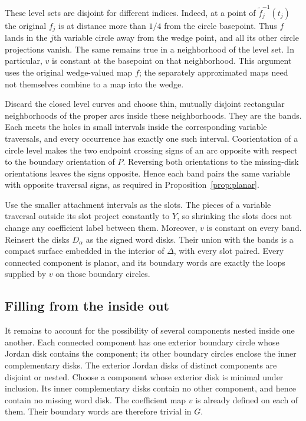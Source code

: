 These level sets are disjoint for different indices. Indeed, at a point
of $\widetilde f_j^{-1}(t_j)$ the original $f_j$ is at distance more
than $1/4$ from the circle basepoint. Thus $f$ lands in the $j$th
variable circle away from the wedge point, and all its other circle
projections vanish. The same remains true in a neighborhood of the
level set. In particular, $v$ is constant at the basepoint on that
neighborhood. This argument uses the original wedge-valued map $f$;
the separately approximated maps need not themselves combine to a map
into the wedge.

Discard the closed level curves and choose thin, mutually disjoint
rectangular neighborhoods of the proper arcs inside these neighborhoods.
They are the bands. Each meets the holes in small intervals inside the
corresponding variable traversals, and every occurrence has exactly one
such interval. Coorientation of a circle level makes the two endpoint
crossing signs of an arc opposite with respect to the boundary
orientation of $P$. Reversing both orientations to the missing-disk
orientations leaves the signs opposite. Hence each band pairs the same
variable with opposite traversal signs, as required in
Proposition~\ref{prop:planar}.

Use the smaller attachment intervals as the slots. The pieces of a
variable traversal outside its slot project constantly to $Y$, so
shrinking the slots does not change any coefficient label between them.
Moreover, $v$ is constant on every band. Reinsert the disks $D_\alpha$
as the signed word disks. Their union with the bands is a compact
surface embedded in the interior of $\Delta$, with every slot paired.
Every connected component is planar, and its boundary words are exactly
the loops supplied by $v$ on those boundary circles.

\subsection{Filling from the inside out}

It remains to account for the possibility of several components nested
inside one another. Each connected component has one exterior boundary
circle whose Jordan disk contains the component; its other boundary
circles enclose the inner complementary disks. The exterior Jordan
disks of distinct components are disjoint or nested. Choose a component
whose exterior disk is minimal under inclusion. Its inner complementary
disks contain no other component, and hence contain no missing word disk.
The coefficient map $v$ is already defined on each of them. Their
boundary words are therefore trivial in $G$.

